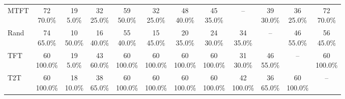 \documentclass[11pt]{article}
\begin{document}
\begin{table}[H]
{\begin{tabular}{lccccccccccc}
MTFT & \shortstack{72\\70.0\%} & \shortstack{19\\5.0\%} & \shortstack{32\\25.0\%} & \shortstack{59\\50.0\%} & \shortstack{32\\25.0\%} & \shortstack{48\\40.0\%} & \shortstack{45\\35.0\%} & -- & \shortstack{39\\30.0\%} & \shortstack{36\\25.0\%} & \shortstack{72\\70.0\%} \\
Rand & \shortstack{74\\65.0\%} & \shortstack{10\\50.0\%} & \shortstack{16\\40.0\%} & \shortstack{55\\40.0\%} & \shortstack{15\\45.0\%} & \shortstack{20\\35.0\%} & \shortstack{24\\30.0\%} & \shortstack{34\\35.0\%} & -- & \shortstack{46\\55.0\%} & \shortstack{56\\45.0\%} \\
TFT & \shortstack{60\\100.0\%} & \shortstack{19\\5.0\%} & \shortstack{43\\60.0\%} & \shortstack{60\\100.0\%} & \shortstack{60\\100.0\%} & \shortstack{60\\100.0\%} & \shortstack{60\\100.0\%} & \shortstack{31\\30.0\%} & \shortstack{46\\55.0\%} & -- & \shortstack{60\\100.0\%} \\
T2T & \shortstack{60\\100.0\%} & \shortstack{18\\10.0\%} & \shortstack{38\\65.0\%} & \shortstack{60\\100.0\%} & \shortstack{60\\100.0\%} & \shortstack{60\\100.0\%} & \shortstack{60\\100.0\%} & \shortstack{42\\100.0\%} & \shortstack{36\\65.0\%} & \shortstack{60\\100.0\%} & -- \\
\bottomrule
\end{tabular}%
}
\endgroup


\end{table}
\end{document}
